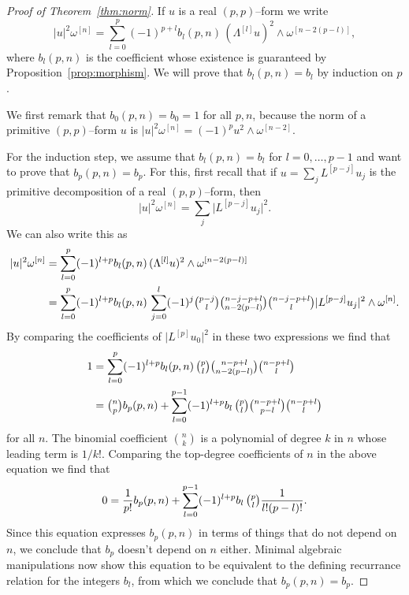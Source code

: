 \documentclass[11pt,a4paper]{amsart}
\def\^#1{^{[#1]}}
\def\wp#1{\omega^{[#1]}}
\def\lp#1{L^{[#1]}}
\theoremstyle{definition}
\numberwithin{equation}{section}
\begin{document}
\begin{proof}[Proof of Theorem~\ref{thm:norm}]
    If $u$ is a real $(p,p)$--form we write
    $$
    \lvert u \rvert^2 \omega\^n
    = \sum_{l=0}^p (-1)^{p+l} b_l(p,n) \, 
    (\Lambda\^l u)^2 \wedge \omega\^{n-2(p-l)},
    $$
where $b_l(p,n)$ is the coefficient whose existence is guaranteed by
Proposition~\ref{prop:morphism}.  We will prove that $b_l(p,n) = b_l$ by
induction on $p$. 

We first remark that $b_0(p,n) = b_0 = 1$ for all $p, n$, because
the norm of a primitive $(p,p)$--form $u$ is $\lvert u \rvert^2 \omega\^n =
(-1)^p u^2 \wedge \omega\^{n-2}$.


For the induction step, we assume that $b_l(p,n) = b_l$ for $l = 0, \ldots,
p-1$ and want to prove that $b_{p}(p,n) = b_{p}$. For this, first
recall that if $u = \sum_j L\^{p-j} u_j$ is the primitive decomposition of
a real $(p,p)$--form, then 
$$
\lvert u \rvert^2 \omega\^n 
= \sum_j \lvert L\^{p-j} u_j \rvert^2.
$$ 
We can also write this as
\begin{align*}
\lvert u \rvert^2 \omega\^n 
&= \sum_{l=0}^p (-1)^{l+p} b_l(p,n) \, 
(\Lambda\^{l} u)^2 \wedge \omega\^{n-2(p-l)}
\\
&= \sum_{l=0}^p (-1)^{l+p} b_l(p,n) \, 
\sum_{j=0}^l 
(-1)^j
  \tbinom{p-j}{l}
  \tbinom{n-j-p+l}{n-2(p-l)}
  \tbinom{n-j-p+l}{l}
  \lvert \lp{p-j} u_j \rvert^2
  \wedge \wp n.
\end{align*}
By comparing the coefficients of $\lvert L\^p u_0 \rvert^2$ in these
two expressions we find that
\begin{align*}
1 &= 
\sum_{l=0}^p (-1)^{l+p} b_l(p,n) \, 
\tbinom{p}{l}
\tbinom{n-p+l}{n-2(p-l)}
\tbinom{n-p+l}{l}
\\
&= \tbinom{n}{p} b_p(p,n)
+ \sum_{l=0}^{p-1} (-1)^{l+p} b_l \, 
\tbinom{p}{l}
\tbinom{n-p+l}{p-l}
\tbinom{n-p+l}{l}
\end{align*}
for all $n$. The binomial coefficient $\binom{n}{k}$ is a polynomial of
degree $k$ in $n$ whose leading term is $1/k!$. Comparing the top-degree
coefficients of $n$ in the above equation we find that
$$
0 =
\frac{1}{p!} b_p(p,n)
+ \sum_{l=0}^{p-1} (-1)^{l+p} b_l \, 
\tbinom{p}{l}
\frac{1}{l! (p-l)!}.
$$
Since this equation expresses $b_p(p,n)$ in terms of things that do not
depend on $n$, we conclude that $b_p$ doesn't depend on $n$ either.
Minimal algebraic manipulations now show this equation to be equivalent to
the defining recurrance relation for the integers $b_l$, from which we
conclude that $b_p(p,n) = b_p$.
\end{proof}
\end{document}

